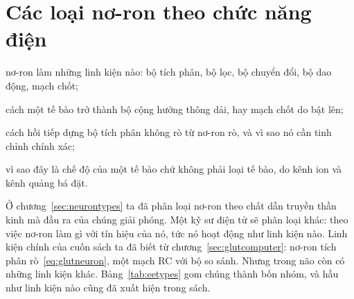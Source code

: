 \chapter{Các loại nơ-ron theo chức năng điện}
\label{sec:eetypes}
\begin{chaptergoals}
\item nơ-ron làm những linh kiện nào: bộ tích phân, bộ lọc, bộ chuyển đổi, bộ dao động, mạch chốt;
\item cách một tế bào trở thành bộ cộng hưởng thông dải, hay mạch chốt do  bật lên;
\item cách hồi tiếp dựng bộ tích phân không rò từ nơ-ron rò, và vì sao nó cần tinh chỉnh chính xác;
\item vì sao đây là chế độ của một tế bào chứ không phải loại tế bào, do kênh ion và kênh quảng bá đặt.
\end{chaptergoals}

Ở chương~\ref{sec:neurontypes} ta đã phân loại nơ-ron theo chất dẫn truyền thần kinh mà đầu ra của chúng giải phóng. Một kỹ sư điện tử sẽ phân loại khác: theo việc nơ-ron làm gì với tín hiệu của nó, tức nó hoạt động như linh kiện nào. Linh kiện chính của cuốn sách ta đã biết từ chương~\ref{sec:glutcomputer}: nơ-ron tích phân rò~\eqref{eq:glutneuron}, một mạch RC với bộ so sánh. Nhưng trong não còn có những linh kiện khác. Bảng~\ref{tab:eetypes} gom chúng thành bốn nhóm, và hầu như linh kiện nào cũng đã xuất hiện trong sách.

